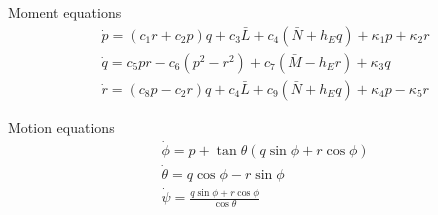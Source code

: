 Moment equations 
\begin{equation}\label{eq4.43}
\begin{aligned}
& \dot{p}=\left(c_1 r+c_2 p\right) q+c_3 \bar{L}+c_4\left(\bar{N}+h_E q\right)+\kappa_1 p+\kappa_2 r \\
& \dot{q}=c_5 p r-c_6\left(p^2-r^2\right)+c_7\left(\bar{M}-h_E r\right)+\kappa_3 q \\
& \dot{r}=\left(c_8 p-c_2 r\right) q+c_4 \bar{L}+c_9\left(\bar{N}+h_E q\right)+\kappa_4 p-\kappa_5 r
\end{aligned}
\end{equation}

Motion equations  
\begin{equation}\label{eq4.44}
\begin{aligned}
& \dot{\phi}=p+\tan \theta(q \sin \phi+r \cos \phi) \\
& \dot{\theta}=q \cos \phi-r \sin \phi \\
& \dot{\psi}=\frac{q \sin \phi+r \cos \phi}{\cos \theta}
\end{aligned}
\end{equation}

